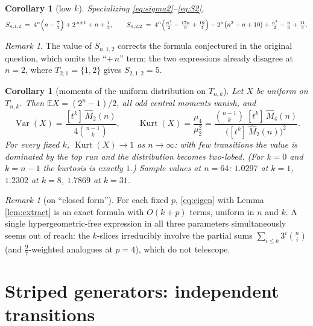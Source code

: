 \documentclass[11pt]{article}
\newtheorem{corollary}[theorem]{Corollary}
\theoremstyle{remark}
\newtheorem{remark}[theorem]{Remark}
\newcommand{\E}{\mathbb{E}}
\newcommand{\Var}{\operatorname{Var}}
\newcommand{\Kurt}{\operatorname{Kurt}}
\newcommand{\hM}{\widehat{M}}
\begin{document}
\begin{corollary}[low $k$]\label{cor:smallk}
Specializing \eqref{eq:sigma2}--\eqref{eq:S2},
\[
S_{n,1,2} \;=\; 4^n \Bigl( n - \tfrac{7}{3} \Bigr) + 2^{\,n+1} + n + \tfrac{1}{3},
\qquad
S_{n,2,2} \;=\; 4^n \Bigl( \tfrac{n^2}{2} - \tfrac{17n}{6} + \tfrac{19}{3} \Bigr)
- 2^n \bigl( n^2 - n + 10 \bigr) + \tfrac{n^2}{2} - \tfrac{n}{6} + \tfrac{11}{3}.
\]
\end{corollary}

\begin{remark}
The value of $S_{n,1,2}$ corrects the formula conjectured in the original question, which omits
the ``$+\,n$'' term; the two expressions already disagree at $n = 2$, where
$T_{2,1} = \{1, 2\}$ gives $S_{2,1,2} = 5$.
\end{remark}

\begin{corollary}[moments of the uniform distribution on $T_{n,k}$]\label{cor:unif}
Let $X$ be uniform on $T_{n,k}$. Then $\E X = (2^n-1)/2$, all odd central moments vanish, and
\[
\Var(X) = \frac{[t^k]\,\hM_2(n)}{4 \binom{n-1}{k}},
\qquad
\Kurt(X) = \frac{\mu_4}{\mu_2^2}
= \frac{\binom{n-1}{k}\; [t^k]\,\hM_4(n)}{\bigl( [t^k]\,\hM_2(n) \bigr)^{2}} .
\]
For every \emph{fixed} $k$, $\Kurt(X) \to 1$ as $n \to \infty$: with few transitions the value
is dominated by the top run and the distribution becomes two-lobed. (For $k = 0$ and $k = n-1$
the kurtosis is exactly $1$.) Sample values at $n = 64$: $1.0297$ at $k = 1$, $1.2302$ at
$k = 8$, $1.7869$ at $k = 31$.
\end{corollary}

\begin{remark}[on ``closed form'']
For each fixed $p$, \eqref{eq:eigen} with Lemma \ref{lem:extract} is an exact formula with
$O(k+p)$ terms, uniform in $n$ and $k$. A single hypergeometric-free expression in all three
parameters simultaneously seems out of reach: the $k$-slices irreducibly involve the partial sums
$\sum_{i \le k} 3^i \binom{n}{i}$ (and $\tfrac{9}{7}$-weighted analogues at $p = 4$), which do
not telescope.
\end{remark}

\section{Striped generators: independent transitions}
\end{document}

